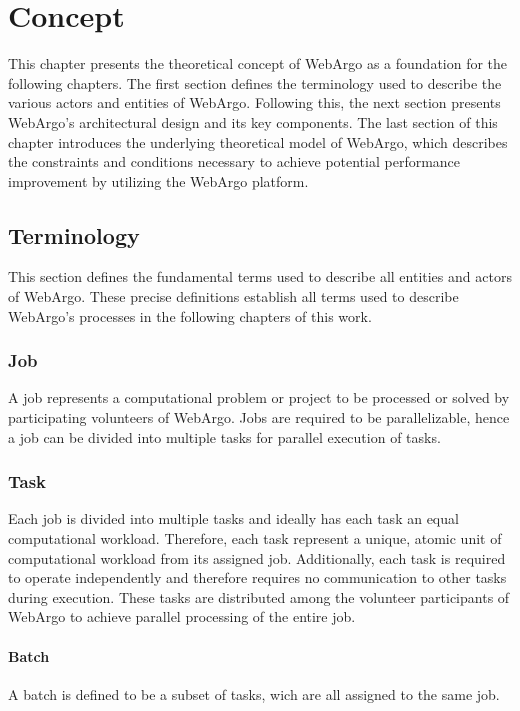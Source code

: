 \chapter{Concept}
\label{ch:concept}
This chapter presents the theoretical concept of WebArgo as a foundation for the following chapters. The first section defines the terminology used to describe the various actors and entities of WebArgo. Following this, the next section presents WebArgo's architectural design and its key components. The last section of this chapter introduces the underlying theoretical model of WebArgo, which describes the constraints and conditions necessary to achieve potential performance improvement by utilizing the WebArgo platform.

\section{Terminology}
\label{sec:concept:terminology}
This section defines the fundamental terms used to describe all entities and actors of WebArgo. These precise definitions establish all terms used to describe WebArgo's processes in the following chapters of this work.

\subsection{Job}
\label{subsec:concept:job}
A job represents a computational problem or project to be processed or solved by participating volunteers of WebArgo. Jobs are required to be parallelizable, hence a job can be divided into multiple tasks for parallel execution of tasks.

\subsection{Task}
\label{subsec:concept:task}
Each job is divided into multiple tasks and ideally has each task an equal computational workload. Therefore, each task represent a unique, atomic unit of computational workload from its assigned job. Additionally, each task is required to operate independently and therefore requires no communication to other tasks during execution. These tasks are distributed among the volunteer participants of WebArgo to achieve parallel processing of the entire job.

\subsubsection{Batch}
\label{ssubsec:concept:batch}
A batch is defined to be a subset of tasks, wich are all assigned to the same job.

